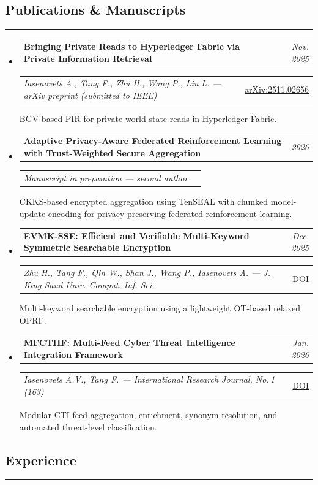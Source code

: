 \documentclass[10.5pt,letterpaper]{article}
\makeatletter
\newcommand{\headerrow}[2]
{\begin{tabular*}{\linewidth}{l@{\extracolsep{\fill}}r}
#1 & #2 \\
\end{tabular*}}
\newcommand{\sectionline}[1]{
\vspace{0.18cm}
\subsection*{\large #1}
\vspace{-0.55em}
\hrule
\vspace{0.25em}
}
\makeatother
\begin{document}
\sectionline{Publications \& Manuscripts}

\begin{itemize}[leftmargin=0em, itemsep=0.35em]
    \renewcommand\labelitemi{}

    \item
    \headerrow
        {\textbf{Bringing Private Reads to Hyperledger Fabric via Private Information Retrieval}}
        {\emph{Nov. 2025}}
    \headerrow
        {\emph{Iasenovets A., Tang F., Zhu H., Wang P., Liu L. --- arXiv preprint (submitted to IEEE)}}
        {\href{https://arxiv.org/abs/2511.02656}{arXiv:2511.02656}}
    {\small BGV-based PIR for private world-state reads in Hyperledger Fabric.}

    \item
    \headerrow
        {\textbf{Adaptive Privacy-Aware Federated Reinforcement Learning with Trust-Weighted Secure Aggregation}}
        {\emph{2026}}
    \headerrow
        {\emph{Manuscript in preparation --- second author}}
        {}
    {\small CKKS-based encrypted aggregation using TenSEAL with chunked model-update encoding for privacy-preserving federated reinforcement learning.}

    \item
    \headerrow
        {\textbf{EVMK-SSE: Efficient and Verifiable Multi-Keyword Symmetric Searchable Encryption}}
        {\emph{Dec. 2025}}
    \headerrow
        {\emph{Zhu H., Tang F., Qin W., Shan J., Wang P., Iasenovets A. --- J. King Saud Univ. Comput. Inf. Sci.}}
        {\href{https://doi.org/10.1007/s44443-025-00405-8}{DOI}}
    {\small Multi-keyword searchable encryption using a lightweight OT-based relaxed OPRF.}

    \item
    \headerrow
        {\textbf{MFCTIIF: Multi-Feed Cyber Threat Intelligence Integration Framework}}
        {\emph{Jan. 2026}}
    \headerrow
        {\emph{Iasenovets A.V., Tang F. --- International Research Journal, No.\,1 (163)}}
        {\href{https://doi.org/10.60797/IRJ.2026.163.57}{DOI}}
    {\small Modular CTI feed aggregation, enrichment, synonym resolution, and automated threat-level classification.}

\end{itemize}

\sectionline{Experience}
\end{document}
